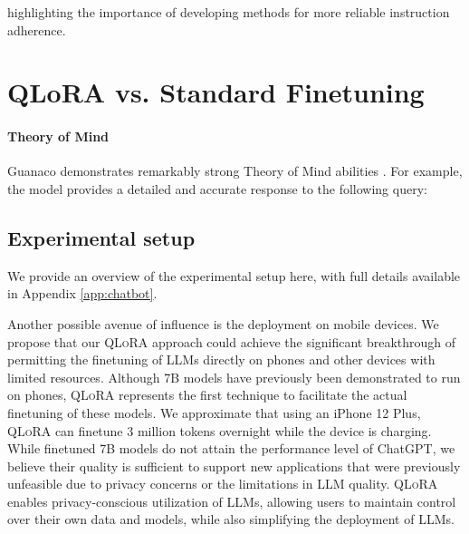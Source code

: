 highlighting the importance of developing methods for more reliable instruction adherence.

\section{QLoRA vs. Standard Finetuning}
\label{sec:comp_to_std}

\paragraph{Theory of Mind} {Guanaco} demonstrates remarkably strong Theory of Mind abilities \cite{nematzadeh2018evaluating, sap2022neural}. For example, the model provides a detailed and accurate response to the following query:

\subsection{Experimental setup} We provide an overview of the experimental setup here, with full details available in Appendix \ref{app:chatbot}.

Another possible avenue of influence is the deployment on mobile devices. We propose that our \textsc{QLoRA} approach could achieve the significant breakthrough of permitting the finetuning of LLMs directly on phones and other devices with limited resources. Although 7B models have previously been demonstrated to run on phones, \textsc{QLoRA} represents the first technique to facilitate the actual finetuning of these models. We approximate that using an iPhone 12 Plus, \textsc{QLoRA} can finetune 3 million tokens overnight while the device is charging. While finetuned 7B models do not attain the performance level of ChatGPT, we believe their quality is sufficient to support new applications that were previously unfeasible due to privacy concerns or the limitations in LLM quality. \textsc{QLoRA} enables privacy-conscious utilization of LLMs, allowing users to maintain control over their own data and models, while also simplifying the deployment of LLMs.

